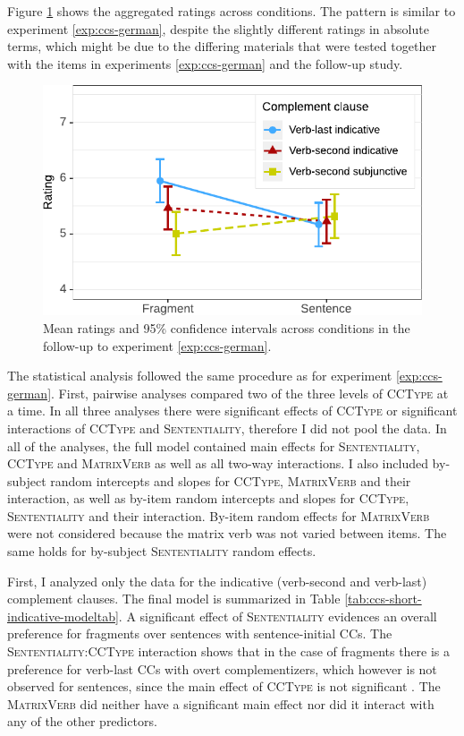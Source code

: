 Figure \ref{fig:ccs-german-short-estimates} shows the aggregated ratings across conditions. The pattern is similar to experiment \ref{exp:ccs-german}, despite the slightly different ratings in absolute terms, which might be due to the differing materials that were tested together with the items in experiments \ref{exp:ccs-german} and the follow-up study.
%
\begin{figure}
\includegraphics[scale=1]{figures/ex2b_ccs_de_sc_estimates}
 \caption{Mean ratings and 95\% confidence intervals across conditions in the follow-up to experiment \ref{exp:ccs-german}. \label{fig:ccs-german-short-estimates}}
\end{figure}
%
The statistical analysis followed the same procedure as for experiment \ref{exp:ccs-german}. First, pairwise analyses compared two of the three levels of \textsc{CCType} at a time. In all three analyses there were significant effects of \textsc{CCType} or significant interactions of \textsc{CCType} and \textsc{Sententiality}, therefore I did not pool the data. In all of the analyses, the full model contained main effects for \textsc{Sententiality}, \textsc{CCType} and \textsc{MatrixVerb} as well as all two-way interactions. I also included by-subject random intercepts and slopes for \textsc{CCType}, \textsc{MatrixVerb} and their interaction, as well as by-item random intercepts and slopes for \textsc{CCType}, \textsc{Sententiality} and their interaction. By-item random effects for \textsc{MatrixVerb} were not considered because the matrix verb was not varied between items. The same holds for by-subject \textsc{Sententiality} random effects.

First, I analyzed only the data for the indicative (verb-second and verb-last) complement clauses. The final model is summarized in Table \ref{tab:ccs-short-indicative-modeltab}. A significant effect of \textsc{Sententiality}  evidences an overall preference for fragments over sentences with sentence-initial CCs. The \textsc{Sententiality:CCType} interaction  shows that in the case of fragments there is a preference for verb-last CCs with overt complementizers, which however is not observed for sentences, since the main effect of \textsc{CCType} is not significant . The \textsc{MatrixVerb} did neither have a significant main effect nor did it interact with any of the other predictors.

